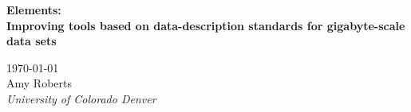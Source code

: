 \begin{titlepage}
\thispagestyle{empty}
\begin{center}
\textbf{\Huge Elements:}\\[0.3cm]
\textbf{\Huge Improving tools based on data-description standards  for gigabyte-scale data sets}\\[0.8cm]

\begin{figure}
\begin{center}
\end{center}
\end{figure}

\textrm{\today}\\[1.8cm]

\textrm{\LARGE Amy Roberts}\\[0.9cm]
\textit{\Large
University of Colorado Denver} 

\end{center}


\end{titlepage}